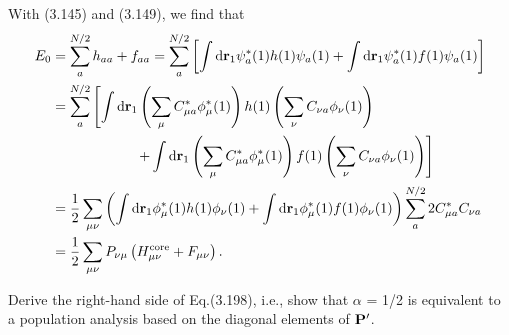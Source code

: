 \documentclass[a4paper]{book}
\newcounter{exercise}[chapter]
\newcounter{solution}[chapter]
\newcommand*{\dif}{\mathop{}\!\mathrm{d}}
\newcommand{\PPP}{{\bf P}}
\newcommand{\bfr}{{\bf r}}
\begin{document}
	\begin{solution}
	With (3.145) and (3.149), we find that
	\begin{align*}
	E_0 &= \sum_a^{N/2} h_{aa} + f_{aa} = \sum_a^{N/2} \left[ \int \dif \bfr_1 \psi^*_a(1) h(1) \psi_a(1) + \int \dif \bfr_1 \psi^*_a(1) f(1) \psi_a(1) \right] \\
		&= \sum_a^{N/2} \left[ \int \dif \bfr_1 \left( \sum_\mu C^*_{\mu a} \phi^*_\mu(1) \right) h(1) \left( \sum_\nu C_{\nu a} \phi_\nu(1) \right) \right. \\
		&\hspace{6em} \left. + \int \dif \bfr_1 \left( \sum_\mu C^*_{\mu a} \phi^*_\mu(1) \right) f(1) \left( \sum_\nu C_{\nu a} \phi_\nu(1) \right) \right] \\
		&= \frac{1}{2} \sum_{\mu \nu} \left( \int \dif \bfr_1 \phi^*_\mu(1) h(1) \phi_\nu(1) + \int \dif \bfr_1 \phi^*_\mu(1) f(1) \phi_\nu(1) \right) \sum_a^{N/2} 2 C^*_{\mu a} C_{\nu a} \\
		&= \frac{1}{2} \sum_{\mu \nu} P_{\nu \mu} \left( H^{\rm core}_{\mu \nu} + F_{\mu \nu} \right) .
	\end{align*}		
	
	\end{solution}
	
	\begin{exercise}
	Derive the right-hand side of Eq.(3.198), i.e., show that $\alpha$ = 1/2 is equivalent to a population analysis based on the diagonal elements of $\PPP^\prime$.
	\end{exercise}
	
\end{document}
